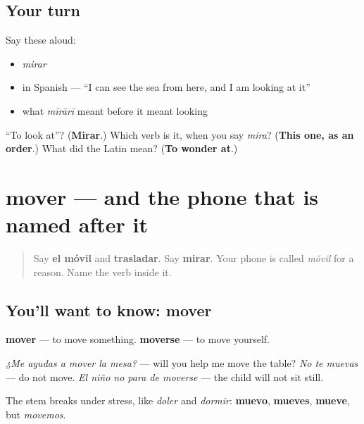 \subsection*{Your turn}
Say these aloud:

\begin{itemize}
\raggedright
  \item \emph{mirar}
  \item in Spanish — \textquotedblleft{}I can see the sea from here, and I am looking at it\textquotedblright{}
  \item what \emph{mīrārī} meant before it meant looking
\end{itemize}

\begin{tcolorbox}[breakable,colback=teal!4,colframe=teal!35!black,title={Before you move on}]
\textquotedblleft{}To look at\textquotedblright{}? (\textbf{Mirar}.) Which verb is it, when you say \emph{mira}? (\textbf{This one, as an order}.) What did the Latin mean? (\textbf{To wonder at}.)
\end{tcolorbox}
\section[mover]{mover — and the phone that is named after it}

\label{lesson:ES-C446-mover}



\begin{quote}
Say \textbf{el móvil} and \textbf{trasladar}. Say \textbf{mirar}. Your phone is called \emph{móvil} for a reason. Name the verb inside it.
\end{quote}

\subsection*{You'll want to know: mover}
\textbf{mover} — to move something. \textbf{moverse} — to move yourself.

\emph{¿Me ayudas a mover la mesa?} — will you help me move the table? \emph{No te muevas} — do not move. \emph{El niño no para de moverse} — the child will not sit still.

The stem breaks under stress, like \emph{doler} and \emph{dormir}: \textbf{muevo}, \textbf{mueves}, \textbf{mueve}, but \emph{movemos}.

